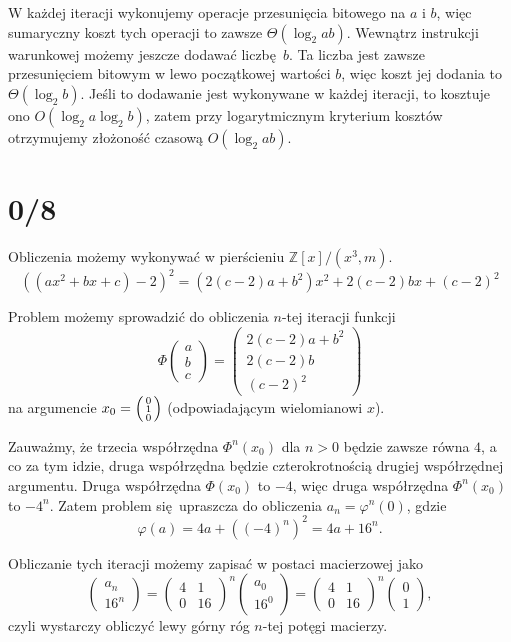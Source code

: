 \documentclass[a4paper, 12pt]{article}
\newcommand{\+}{\enspace}
\begin{document}

W każdej iteracji wykonujemy operacje przesunięcia bitowego na $a$ i $b$,
więc sumaryczny koszt tych operacji to zawsze $Θ(\log_2 ab)$.
Wewnątrz instrukcji warunkowej możemy jeszcze dodawać liczbę $b$.
Ta liczba jest zawsze przesunięciem bitowym w lewo początkowej wartości $b$,
więc koszt jej dodania to $Θ(\log_2 b)$.
Jeśli to dodawanie jest wykonywane w każdej iteracji, to kosztuje ono
$O(\log_2 a \log_2 b)$, zatem przy logarytmicznym kryterium kosztów
otrzymujemy złożoność czasową $O(\log_2 ab)$.

\section*{0/8}
Obliczenia możemy wykonywać w pierścieniu $ℤ[x]/(x^3, m)$.
$$ ((ax^2 + bx + c) - 2)^2 = (2(c-2)a+b^2)x^2 + 2(c-2)bx + (c-2)^2$$

Problem możemy sprowadzić do obliczenia $n$-tej iteracji funkcji
$$Φ\begin{pmatrix}a \\ b \\ c\end{pmatrix}
= \begin{pmatrix}2(c-2)a + b^2 \\ 2(c-2)b \\ (c-2)^2\end{pmatrix}
$$
na argumencie $x_0 = \begin{psmallmatrix}0 \\ 1 \\ 0\end{psmallmatrix}$
(odpowiadającym wielomianowi $x$).

Zauważmy, że trzecia współrzędna $Φ^n(x_0)$ dla $n>0$ będzie zawsze równa $4$,
a co za tym idzie, druga współrzędna będzie czterokrotnością drugiej
współrzędnej argumentu.
Druga współrzędna $Φ(x_0)$ to $-4$, więc druga współrzędna $Φ^n(x_0)$ to $-4^n$.
Zatem problem się upraszcza do obliczenia $a_n = φ^n(0)$, gdzie
$$φ(a)
= 4a + ((-4)^n)^2 = 4a + 16^n.
$$

Obliczanie tych iteracji możemy zapisać w postaci macierzowej jako
$$
\begin{pmatrix}
	a_n \\
	16^n
\end{pmatrix}
=
\begin{pmatrix}
	4 & 1 \\
	0 & 16
\end{pmatrix}^n
\begin{pmatrix}
	a_0 \\
	16^0
\end{pmatrix}
=
\begin{pmatrix}
	4 & 1 \\
	0 & 16
\end{pmatrix}^n
\begin{pmatrix}
	0 \\
	1
\end{pmatrix},
$$
czyli wystarczy obliczyć lewy górny róg $n$-tej potęgi macierzy.
\end{document}
